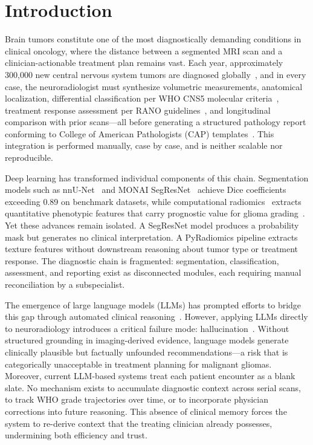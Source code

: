 \section{Introduction}

Brain tumors constitute one of the most diagnostically demanding conditions in clinical oncology, where the distance between a segmented MRI scan and a clinician-actionable treatment plan remains vast. Each year, approximately 300,000 new central nervous system tumors are diagnosed globally~\cite{ostrom2021cbtrus}, and in every case, the neuroradiologist must synthesize volumetric measurements, anatomical localization, differential classification per WHO CNS5 molecular criteria~\cite{louis2021who}, treatment response assessment per RANO guidelines~\cite{wen2010rano}, and longitudinal comparison with prior scans---all before generating a structured pathology report conforming to College of American Pathologists (CAP) templates~\cite{cap2024}. This integration is performed manually, case by case, and is neither scalable nor reproducible.

Deep learning has transformed individual components of this chain. Segmentation models such as nnU-Net~\cite{isensee2021nnu} and MONAI SegResNet~\cite{monai2023} achieve Dice coefficients exceeding 0.89 on benchmark datasets, while computational radiomics~\cite{vangriethuysen2017radiomics} extracts quantitative phenotypic features that carry prognostic value for glioma grading~\cite{kickingereder2016radiomic}. Yet these advances remain isolated. A SegResNet model produces a probability mask but generates no clinical interpretation. A PyRadiomics pipeline extracts texture features without downstream reasoning about tumor type or treatment response. The diagnostic chain is fragmented: segmentation, classification, assessment, and reporting exist as disconnected modules, each requiring manual reconciliation by a subspecialist.

The emergence of large language models (LLMs) has prompted efforts to bridge this gap through automated clinical reasoning~\cite{singhal2023llm}. However, applying LLMs directly to neuroradiology introduces a critical failure mode: hallucination~\cite{kalai2025hallucinate, das2025hallucinate}. Without structured grounding in imaging-derived evidence, language models generate clinically plausible but factually unfounded recommendations---a risk that is categorically unacceptable in treatment planning for malignant gliomas. Moreover, current LLM-based systems treat each patient encounter as a blank slate. No mechanism exists to accumulate diagnostic context across serial scans, to track WHO grade trajectories over time, or to incorporate physician corrections into future reasoning. This absence of clinical memory forces the system to re-derive context that the treating clinician already possesses, undermining both efficiency and trust.

